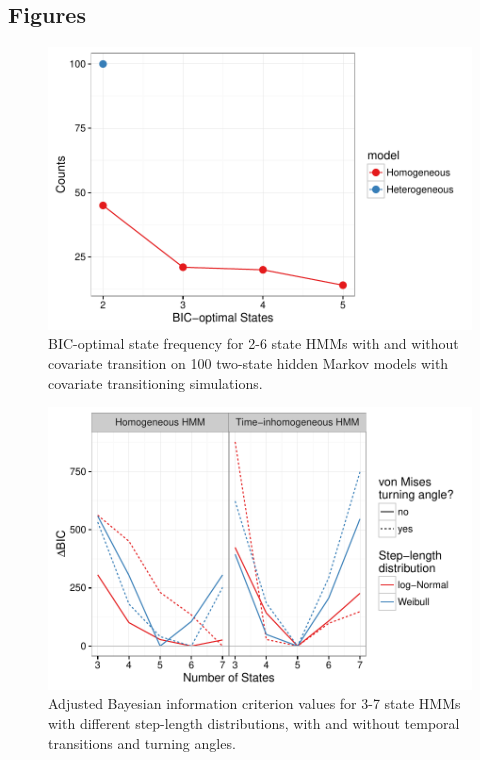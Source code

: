 \documentclass{bmcart}
\begin{document}
\begin{backmatter}
\section*{Figures}
  \begin{figure}[h!]
   \includegraphics[width=5in]{figure/sim_results-1}
  \caption{ BIC-optimal state frequency for 2-6 state HMMs with and without covariate transition on 100 two-state hidden Markov models with covariate transitioning simulations.}
      \end{figure}

  \begin{figure}[h!]
   \includegraphics[width=5in]{figure/BICred_plot-1}
  \caption{ Adjusted Bayesian information criterion values for 3-7 state HMMs with different step-length distributions, with and without temporal transitions and turning angles.}
      \end{figure}
      

\end{backmatter}
\end{document}

